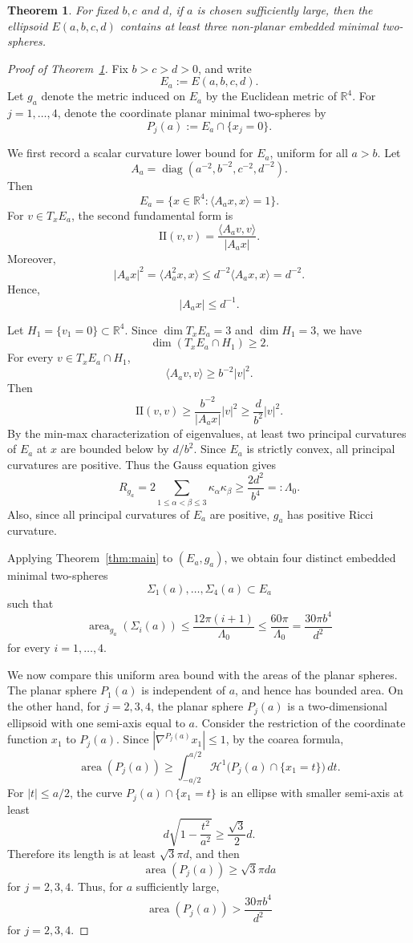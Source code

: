 \documentclass[10pt,a4paper]{amsart}
\newtheorem{theorem}{Theorem}
\begin{document}
\begin{theorem}
\label{thm:yau}
For fixed $b,c$ and $d$, if $a$ is chosen sufficiently large, then the ellipsoid $E(a,b,c,d)$ contains at least three non-planar embedded minimal two-spheres.
\end{theorem}

\begin{proof}[Proof of Theorem~\ref{thm:yau}]
Fix \(b>c>d>0\), and write
\[
E_a:=E(a,b,c,d).
\]
Let \(g_a\) denote the metric induced on \(E_a\) by the Euclidean metric of
\(\mathbb R^4\). For \(j=1,\ldots,4\), denote the coordinate planar minimal
two-spheres by
\[
P_j(a):=E_a\cap\{x_j=0\}.
\]

We first record a scalar curvature lower bound for \(E_a\), uniform for all
\(a>b\). Let
\[
A_a=\operatorname{diag}(a^{-2},b^{-2},c^{-2},d^{-2}).
\]
Then
\[
E_a=\{x\in\mathbb R^4:\langle A_a x,x\rangle=1\}.
\]
For \(v\in T_xE_a\), the second fundamental form is
\[
\mathrm{II}(v,v)=\frac{\langle A_a v,v\rangle}{|A_a x|}.
\]
Moreover,
\[
|A_a x|^2
=
\langle A_a^2x,x\rangle
\le
d^{-2}\langle A_a x,x\rangle
=
d^{-2}.
\]
Hence,
\[
|A_a x|\le d^{-1}.
\]

Let \(H_1=\{v_1=0\}\subset\mathbb R^4\). Since
\(\dim T_xE_a=3\) and \(\dim H_1=3\), we have
\[
\dim(T_xE_a\cap H_1)\ge2.
\]
For every \(v\in T_xE_a\cap H_1\),
\[
\langle A_a v,v\rangle
\ge
b^{-2}|v|^2.
\]
Then
\[
\mathrm{II}(v,v)
\ge
\frac{b^{-2}}{|A_a x|}|v|^2
\ge
\frac{d}{b^2}|v|^2.
\]
By the min-max characterization of eigenvalues, at least two principal curvatures
of \(E_a\) at \(x\) are bounded below by \(d/b^2\). Since \(E_a\) is strictly convex,
all principal curvatures are positive. Thus the Gauss equation gives
\[
R_{g_a}
=
2\sum_{1\le \alpha<\beta\le3}\kappa_\alpha\kappa_\beta
\ge
\frac{2d^2}{b^4} =: \Lambda_0.
\]
Also, since all principal curvatures of \(E_a\) are positive, \(g_a\) has positive
Ricci curvature.

Applying Theorem~\ref{thm:main} to \((E_a,g_a)\), we obtain four distinct embedded minimal two-spheres
\[
\Sigma_1(a),\ldots,\Sigma_4(a)\subset E_a
\]
such that
\[
\operatorname{area}_{g_a}(\Sigma_i(a))
\le
\frac{12\pi(i+1)}{\Lambda_0}
\le
\frac{60\pi}{\Lambda_0}
=
\frac{30\pi b^4}{d^2}
\]
for every \(i=1,\ldots,4\).

We now compare this uniform area bound with the areas of the planar spheres. The planar sphere \(P_1(a)\) is independent of \(a\), and hence has bounded area. On the other hand, for \(j=2,3,4\), the planar sphere \(P_j(a)\) is a two-dimensional ellipsoid with one semi-axis equal to \(a\). Consider the restriction of the coordinate function \(x_1\) to \(P_j(a)\).
Since \(|\nabla^{P_j(a)}x_1|\le1\), by the coarea formula,
\[
\operatorname{area}(P_j(a))
\ge
\int_{-a/2}^{a/2}
\mathcal H^1\bigl(P_j(a)\cap\{x_1=t\}\bigr)\,dt.
\]
For \(|t|\le a/2\), the curve \(P_j(a)\cap\{x_1=t\}\) is an ellipse with smaller semi-axis at least
\[
d\sqrt{1-\frac{t^2}{a^2}}
\ge
\frac{\sqrt3}{2}d.
\]
Therefore its length is at least \(\sqrt3\pi d\), and then
\[
\operatorname{area}(P_j(a))
\ge
\sqrt3\pi da
\]
for \(j=2,3,4\). Thus, for \(a\) sufficiently large,
\[
\operatorname{area}(P_j(a))
>
\frac{30\pi b^4}{d^2}
\]
for \(j=2,3,4\).


\end{proof}
\end{document}

